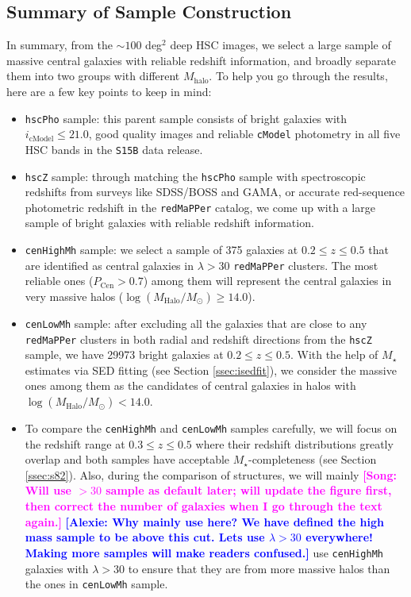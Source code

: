 \documentclass{emulateapj}
\def\redm{\texttt{redMaPPer}}
\def\rbcg{\texttt{cenHighMh}}
\def\nbcg{\texttt{cenLowMh}}
\def\mstar{{$M_{\star}$}}
\def\mhalo{{$M_{\mathrm{halo}}$}}
\def\logmh{{$\log (M_{\mathrm{Halo}}/M_{\odot})$}}
\newcommand{\song}[1]{\textcolor{magenta}{\textbf{[Song: #1]}}}
\newcommand{\alexie}[1]{\textcolor{blue}{\textbf{[Alexie: #1]}}}
\begin{document}
\begin{CJK*}{UTF8}{gbsn}
\subsection{Summary of Sample Construction}
    \label{ssec:sample}

    In summary, from the $\sim 100$ deg$^2$ deep HSC images, we select a large sample
    of massive central galaxies with reliable redshift information, and broadly separate 
    them into two groups with different \mhalo{}.  
    To help you go through the results, here are a few key points to keep in mind:
    
    \begin{itemize}
        \item \texttt{hscPho} sample: this parent sample consists of bright galaxies 
            with $i_{\mathrm{cModel}} \leq 21.0$, good quality images and reliable 
            \texttt{cModel} photometry in all five HSC bands in the \texttt{S15B} 
            data release. 
        \item \texttt{hscZ} sample: through matching the \texttt{hscPho} sample with 
            spectroscopic redshifts from surveys like SDSS/BOSS and GAMA, or accurate 
            red-sequence photometric redshift in the \redm{} catalog, we come up with 
            a large sample of bright galaxies with reliable redshift information. 
        \item \rbcg{} sample: we select a sample of 375 galaxies at $0.2 \leq z \leq 0.5$
            that are identified as central galaxies in $\lambda > 30$ \redm{} clusters. 
            The most reliable ones ($P_{\mathrm{Cen}} >0.7$) among 
            them will represent the central galaxies in very massive halos
            (\logmh{}$\geq 14.0$). 
        \item \nbcg{} sample: after excluding all the galaxies that are close to any 
            \redm{} clusters in both radial and redshift directions from the 
            \texttt{hscZ} sample, we have 29973 bright galaxies at $0.2 \leq z \leq 0.5$.
            With the help of \mstar{} estimates via SED fitting (see Section 
            \ref{ssec:isedfit}), we consider the massive ones among them as the 
            candidates of central galaxies in halos with \logmh{}$<14.0$.  
        \item To compare the \rbcg{} and \nbcg{} samples carefully, we will focus on 
            the redshift range at $0.3 \leq z \leq 0.5$ where their redshift 
            distributions greatly overlap and both samples have acceptable
            \mstar-completeness (see Section \ref{ssec:s82}).  
            Also, during the comparison of structures, we will mainly 
            \song{Will use $>30$ sample as default later; will update the figure first, 
            then correct the number of galaxies when I go through the text again.}
            \alexie{Why mainly use here? We have defined the high mass sample to be above this cut. Lets use $\lambda>30$ everywhere! Making more samples will make readers confused.} use \rbcg{} 
            galaxies with $\lambda > 30$ to ensure that they are from more massive 
            halos than the ones in \nbcg{} sample.
    \end{itemize}


\end{CJK*}
\end{document}
